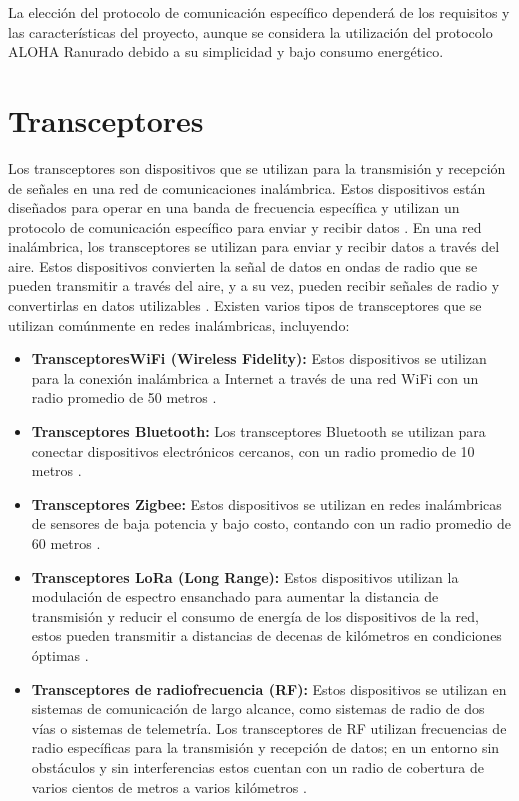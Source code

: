 \noindent La elección del protocolo de comunicación específico dependerá de los requisitos y las características del proyecto, aunque se considera la utilización del protocolo ALOHA Ranurado debido a su simplicidad y bajo consumo energético.

\section{Transceptores}

Los transceptores son dispositivos que se utilizan para la transmisión y recepción de señales en una red de comunicaciones inalámbrica. Estos dispositivos están diseñados para operar en una banda de frecuencia específica y utilizan un protocolo de comunicación específico para enviar y recibir datos \cite{60}. En una red inalámbrica, los transceptores se utilizan para enviar y recibir datos a través del aire. Estos dispositivos convierten la señal de datos en ondas de radio que se pueden transmitir a través del aire, y a su vez, pueden recibir señales de radio y convertirlas en datos utilizables \cite{61}. Existen varios tipos de transceptores que se utilizan comúnmente en redes inalámbricas, incluyendo:

\begin{itemize}
    \item \textbf{TransceptoresWiFi (Wireless Fidelity):} Estos dispositivos se utilizan para la conexión inalámbrica a Internet a través de una red WiFi con un radio promedio de 50 metros \cite{53}.
    \item \textbf{Transceptores Bluetooth:} Los transceptores Bluetooth se utilizan para conectar dispositivos electrónicos cercanos, con un radio promedio de 10 metros \cite{54}.
    \item \textbf{Transceptores Zigbee:} Estos dispositivos se utilizan en redes inalámbricas de sensores de baja potencia y bajo costo, contando con un radio promedio de 60 metros \cite{55}.
    \item \textbf{Transceptores LoRa (Long Range):} Estos dispositivos utilizan la modulación de espectro ensanchado para aumentar la distancia de transmisión y reducir el consumo de energía de los dispositivos de la red, estos pueden transmitir a distancias de decenas de kilómetros en condiciones óptimas \cite{56}.
    \item \textbf{Transceptores de radiofrecuencia (RF):} Estos dispositivos se utilizan en sistemas de comunicación de largo alcance, como sistemas de radio de dos vías o sistemas de telemetría. Los transceptores de RF utilizan frecuencias de radio específicas para la transmisión y recepción de datos; en un entorno sin obstáculos y sin interferencias estos cuentan con un radio de cobertura de varios cientos de metros a varios kilómetros \cite{62}.
\end{itemize}

